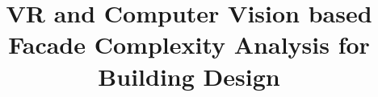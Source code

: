 \documentclass[5p,times]{elsarticle}%
\begin{document}
\begin{frontmatter}

\title{VR and Computer Vision based Facade Complexity Analysis for Building Design}

\author[inst1]{~}

\affiliation[inst1]{~}

\affiliation[inst2]{~}

\affiliation[inst3]{~}

%
%


\begin{abstract}


\end{abstract}




\end{frontmatter}
\end{document}
